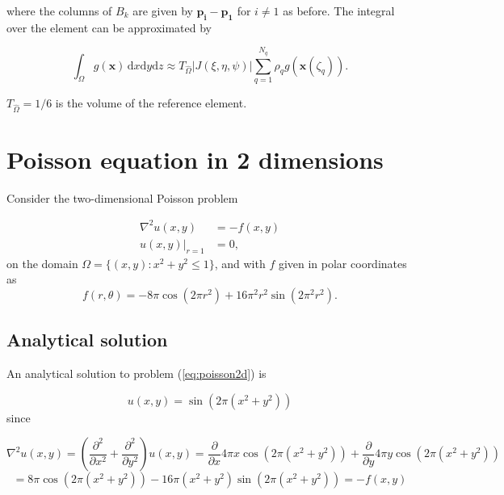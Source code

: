 \documentclass[paper=a4, fontsize=11pt]{scrartcl} %
\begin{document}
where the columns of $B_k$ are given by $\mathbf{p_i}-\mathbf{p_1}$ for $i\neq1$ as before. The integral over the element can be approximated by

\[ \int_{\Omega} \! g(\mathbf{x}) \, \mathrm{d}x\mathrm{d}y\mathrm{d}z  \approx T_{\hat{\Omega}} |J(\xi,\eta,\psi)| \sum_{q=1}^{N_q} \rho_{q}g(\mathbf{x}(\zeta_q)).
\]

$T_{\hat{\Omega}}=1/6$ is the volume of the reference element.

\section{Poisson equation in 2 dimensions}

Consider the two-dimensional Poisson problem

\begin{equation}
\begin{aligned}
\nabla^2u(x,y) 	&= -f(x,y) \\
u(x,y)|_{r=1} 	&= 0,
\end{aligned}
\label{eq:poisson2d}
\end{equation}
on the domain $\Omega = \{(x,y) : x^2+y^2\leq 1\}$, and with $f$ given in polar coordinates as
\[ f(r,\theta)= -8\pi \cos(2\pi r^2)+16\pi^2r^2\sin(2\pi^2 r^2).\]

\subsection{Analytical solution}
An analytical solution to problem (\ref{eq:poisson2d}) is 

\begin{equation}
u(x,y)=\sin\left(2\pi(x^2+y^2)\right)
\label{eq:poisson2danal}
\end{equation}
since

\[\nabla^2u(x,y) = \left( \frac{\partial^2}{\partial x^2} + \frac{\partial^2}{\partial y^2} \right) u(x,y) = \frac{\partial}{\partial x} 4\pi x\cos\left(2\pi(x^2+y^2)\right) + \frac{\partial}{\partial y} 4\pi y\cos\left(2\pi(x^2+y^2)\right)
\]\[= 8\pi\cos\left(2\pi(x^2+y^2)\right) -16\pi(x^2+y^2)\sin\left(2\pi(x^2+y^2)\right) = -f(x,y)\]
\end{document}
